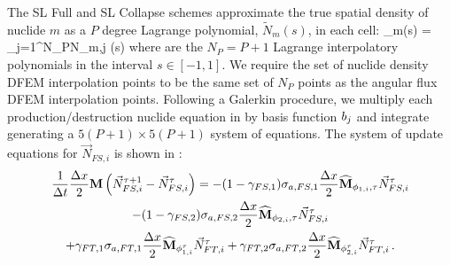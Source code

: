 The SL Full and SL Collapse schemes approximate the true spatial density of nuclide $m$ as a $P$ degree Lagrange polynomial, $\widetilde{N}_m(s)$, in each cell:
\benum
{}_m(s) = \sum_{j=1}^{N_P}{N_{m,j} (s)} \pec
\label{eq:nuc_m_unk}
\eenum
where  are the $N_P = P+1$  Lagrange interpolatory polynomials in the interval $s\in[-1,1]$.  
We require the set of nuclide density DFEM interpolation points to be the same set of $N_P$ points as the angular flux DFEM interpolation points.
Following a Galerkin procedure, we multiply each production/destruction nuclide equation in  by basis function $b_{j} $ and integrate generating a $5(P+1) \times 5(P+1)$ system of equations.
The system of update equations for $\vec{N}_{FS,i}$ is shown in :
\begin{multline}
\frac{1}{\Delta t}\frac{\Delta x}{2} \mathbf M\left(\vec{N}_{FS,i}^{\tau+1} - \vec{N}_{FS,i}^{\tau} \right) = -(1-\gamma_{FS,1})\sigma_{a,FS,1}\frac{\Delta x}{2}\widehat{\mathbf M}_{\phi_{1,i},\tau}\vec{N}_{FS,i}^{\tau} \\
- (1-\gamma_{FS,2})\sigma_{a,FS,2}\frac{\Delta x}{2}\widehat{\mathbf M}_{\phi_{2,i},\tau}\vec{N}_{FS,i}^{\tau} \\
+ \gamma_{FT,1}\sigma_{a,FT,1}\frac{\Delta x}{2}\widehat{\mathbf M}_{\phi_{1,i}^{\tau}}\vec{N}_{FT,i}^{\tau}  + \gamma_{FT,2}\sigma_{a,FT,2}\frac{\Delta x}{2}\widehat{\mathbf M}_{\phi_{2,i}^{\tau}}\vec{N}_{FT,i}^{\tau} 
\, .
\label{eq:dfem_nuclide}
\end{multline}
%
